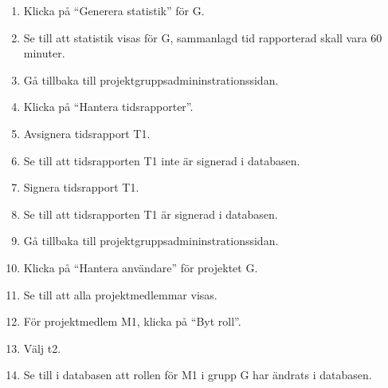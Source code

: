 \documentclass[a4paper]{article}
\begin{document}
\begin{FT}
\begin{enumerate}
\item Klicka på ``Generera statistik'' för G.
\item Se till att statistik visas för G, sammanlagd tid rapporterad skall vara 60 minuter.
\item Gå tillbaka till projektgruppsadmininstrationssidan.
\item Klicka på ``Hantera tidsrapporter''.
\item Avsignera tidsrapport T1.
\item Se till att tidsrapporten T1 inte är signerad i databasen.
\item Signera tidsrapport T1.
\item Se till att tidsrapporten T1 är signerad i databasen.
\item Gå tillbaka till projektgruppsadmininstrationssidan.
\item Klicka på ``Hantera användare'' för projektet G.
\item Se till att alla projektmedlemmar visas.
\item För projektmedlem M1, klicka på ``Byt roll''.
\item Välj t2.
\item Se till i databasen att rollen för M1 i grupp G har ändrats i databasen.
\end{enumerate}
\end{FT}
\end{document}

